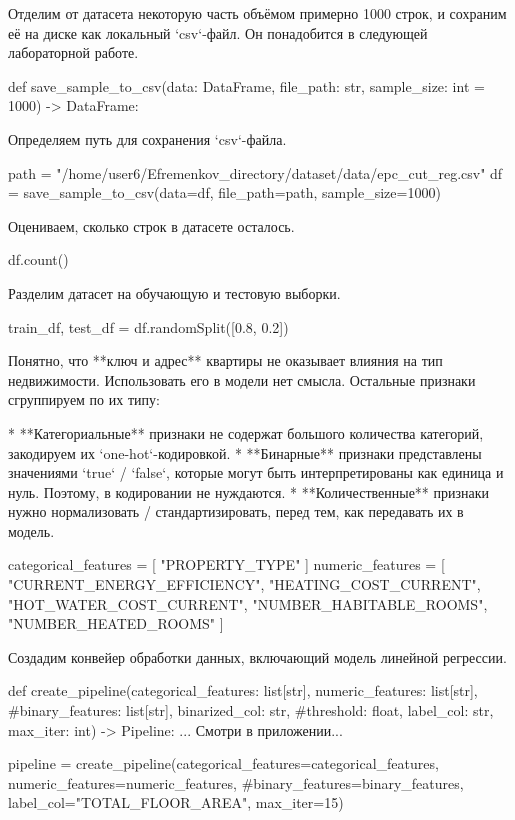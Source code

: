 Отделим от датасета некоторую часть объёмом примерно 1000 строк, и сохраним её на диске как локальный `csv`-файл. Он понадобится в следующей лабораторной работе.
\begin{code}
def save_sample_to_csv(data: DataFrame, file_path: str, 
                       sample_size: int = 1000) -> DataFrame:
\end{code}

Определяем путь для сохранения `csv`-файла.
\begin{code}
path = "/home/user6/Efremenkov_directory/dataset/data/epc_cut_reg.csv"
df = save_sample_to_csv(data=df, file_path=path, sample_size=1000)
\end{code}

Оцениваем, сколько строк в датасете осталось.
\begin{code}
df.count()
\end{code}

Разделим датасет на обучающую и тестовую выборки.
\begin{code}
train_df, test_df = df.randomSplit([0.8, 0.2])
\end{code}

Понятно, что **ключ и адрес** квартиры не оказывает влияния на тип недвижимости. Использовать его в модели нет смысла.
Остальные признаки сгруппируем по их типу:

* **Категориальные** признаки не содержат большого количества категорий, закодируем их `one-hot`-кодировкой.
* **Бинарные** признаки представлены значениями `true` / `false`, которые могут быть интерпретированы как единица и нуль. Поэтому, в кодировании не нуждаются.
* **Количественные** признаки нужно нормализовать / стандартизировать, перед тем, как передавать их в модель.

\begin{code}
categorical_features = [ "PROPERTY_TYPE" ]
numeric_features = [
    "CURRENT_ENERGY_EFFICIENCY", "HEATING_COST_CURRENT", "HOT_WATER_COST_CURRENT", "NUMBER_HABITABLE_ROOMS", "NUMBER_HEATED_ROOMS"
]
\end{code}

Создадим конвейер обработки данных, включающий модель линейной регрессии.
\begin{code}
def create_pipeline(categorical_features: list[str], 
                    numeric_features: list[str], 
                    #binary_features: list[str], binarized_col: str, 
                    #threshold: float, 
                    label_col: str, max_iter: int) -> Pipeline: ... Смотри в приложении...
                    
pipeline = create_pipeline(categorical_features=categorical_features,
                           numeric_features=numeric_features,
                           #binary_features=binary_features,
                           label_col="TOTAL_FLOOR_AREA",
                           max_iter=15)
\end{code}


